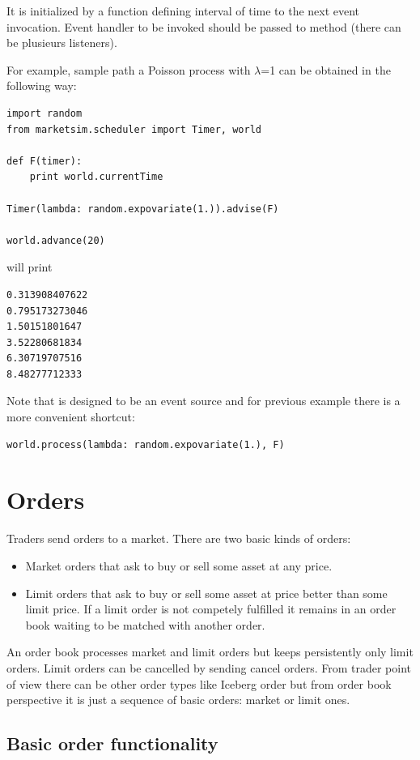 \documentclass[a4paper,11pt]{article}
\newcommand{\tmtexttt}[1]{{\ttfamily{#1}}}
\begin{document}
It is initialized by a function defining interval of time to the next event invocation. Event handler to be invoked should be passed to \tmtexttt{advise} method (there can be plusieurs listeners).

For example, sample path a Poisson process with $\lambda$=1 can be obtained in the following way:
\begin{verbatim}
import random
from marketsim.scheduler import Timer, world

def F(timer):
    print world.currentTime
    
Timer(lambda: random.expovariate(1.)).advise(F)

world.advance(20)
\end{verbatim}

will print 

\begin{verbatim}
0.313908407622
0.795173273046
1.50151801647
3.52280681834
6.30719707516
8.48277712333
\end{verbatim}

Note that \tmtexttt{Timer} is designed to be an event source and for previous example there is a more convenient shortcut:

\begin{verbatim}
world.process(lambda: random.expovariate(1.), F)
\end{verbatim}

\section{Orders}

Traders send orders to a market. There are two basic kinds of orders: 
\begin{itemize}
\item Market orders that ask to buy or sell some asset at any price. 
\item Limit orders that ask to buy or sell some asset at price better than some limit price. If a limit order is not competely fulfilled it remains in an order book waiting to be matched with another order.
\end{itemize}
An order book processes market and limit orders but keeps persistently only limit orders. Limit orders can be cancelled by sending cancel orders.
From trader point of view there can be other order types like Iceberg order but from order book perspective it is just a sequence of basic orders: market or limit ones. 

\subsection{Basic order functionality}
\end{document}

